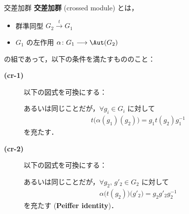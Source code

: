 \documentclass[TQFT_main]{subfiles}
\begin{document}
\begin{mydef}[label=def:crossed-module]{交差加群}
    \textbf{交差加群} (crossed module) とは，
    \begin{itemize}
        \item 群準同型 $G_2 \xrightarrow{t} G_1$
        \item $G_1$ の左作用 $\alpha \colon G_1 \lto \Aut (G_2)$
    \end{itemize}
    の組であって，以下の条件を満たすもののこと：
    \begin{description}
        \item[\textbf{(cr-1)}]
        以下の図式を可換にする：
        \begin{center}
        \end{center}
        あるいは同じことだが，$\forall g_i \in G_i$ に対して
        \begin{align}
            t \bigl( \alpha(g_1)(g_2) \bigr) = g_1 t(g_2) g_1^{-1}
        \end{align}
        を充たす．

        \item[\textbf{(cr-2)}]
        以下の図式を可換にする：
        \begin{center}
        \end{center}
        あるいは同じことだが，$\forall g_2,\, g'_2 \in G_2$ に対して
        \begin{align}
            \alpha \bigl( t(g_2) \bigr) \bigl( g'_2 \bigr)  = g_2 g'_2 g_2^{-1}
        \end{align}
        を充たす (\textbf{Peiffer identity})．
    \end{description}

\end{mydef}
\end{document}
